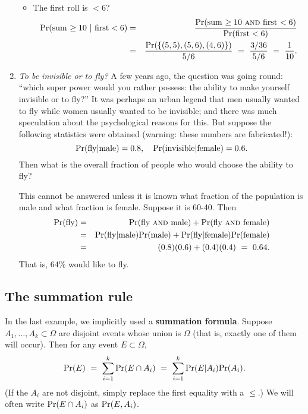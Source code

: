 \begin{enumerate}
\begin{itemize}
\item The first roll is $< 6$?
\begin{eqnarray*}
\pr(\mbox{sum $\geq 10$} \ | \ \mbox{first} < 6) 
& = & 
\frac{\pr(\mbox{sum $\geq 10$ {\sc and} first $< 6$})}{\pr(\mbox{first} < 6)} \\
& = &
\frac{\pr(\{(5,5), (5,6), (4,6)\})}{5/6}
\ = \ 
\frac{3/36}{5/6} \ = \ \frac{1}{10} .
\end{eqnarray*}

\end{itemize}

\item {\it To be invisible or to fly?} A few years ago, the question was going round: ``which super power would you rather possess: the ability to make yourself invisible or to fly?'' It was perhaps an urban legend that men usually wanted to fly while women usually wanted to be invisible; and there was much speculation about the psychological reasons for this. But suppose the following statistics were obtained (warning: these numbers are fabricated!):
$$ \pr(\mbox{fly} | \mbox{male}) = 0.8, \ \ \ \pr(\mbox{invisible} | \mbox{female}) = 0.6 .$$
Then what is the overall fraction of people who would choose the ability to fly?

This cannot be answered unless it is known what fraction of the population is male and what fraction is female. Suppose it is 60-40. Then
\begin{eqnarray*}
\mbox{\rm Pr}(\mbox{fly}) 
& = & \mbox{\rm Pr}(\mbox{fly {\sc and} male}) + \mbox{\rm Pr}(\mbox{fly {\sc and} female}) \\
& = & \mbox{\rm Pr}(\mbox{fly}| \mbox{male}) \mbox{\rm Pr}(\mbox{male}) + \mbox{\rm Pr}(\mbox{fly}| \mbox{female}) \mbox{\rm Pr}(\mbox{female}) \\
& = & (0.8)(0.6) + (0.4)(0.4) \ = \ 0.64.
\end{eqnarray*}
That is, $64\%$ would like to fly.
\end{enumerate}

\subsection{The summation rule}

In the last example, we implicitly used a {\bf summation formula}. Suppose $A_1, \ldots, A_k \subset \Omega$ are disjoint events whose union is $\Omega$ (that is, exactly one of them will occur). Then for any event $E \subset \Omega$,
$$ \pr(E) 
\ = \ 
\sum_{i=1}^k \pr(E \cap A_i) 
\ = \ 
\sum_{i=1}^k \pr(E | A_i) \pr(A_i).
$$
(If the $A_i$ are not disjoint, simply replace the first equality with a $\leq$.) We will often write $\mbox{\rm Pr}(E \cap A_i)$ as $\mbox{\rm Pr}(E,A_i)$.

